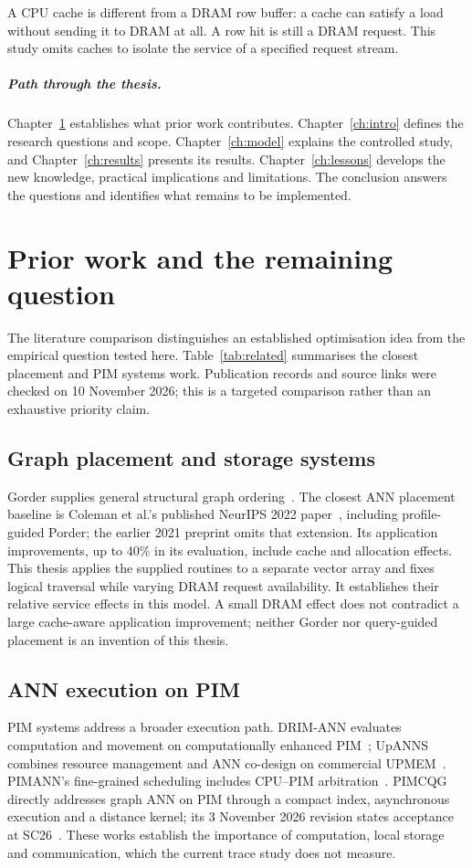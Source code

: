 \documentclass[11pt,a4paper]{report}
\begin{document}
A CPU cache is different from a DRAM row buffer: a cache can satisfy a load without sending it to DRAM at all. A row hit is still a DRAM request. This study omits caches to isolate the service of a specified request stream.

\paragraph{Path through the thesis.}
Chapter~\ref{ch:related} establishes what prior work contributes. Chapter~\ref{ch:intro} defines the research questions and scope. Chapter~\ref{ch:model} explains the controlled study, and Chapter~\ref{ch:results} presents its results. Chapter~\ref{ch:lessons} develops the new knowledge, practical implications and limitations. The conclusion answers the questions and identifies what remains to be implemented.

\chapter{Prior work and the remaining question}\label{ch:related}
\label{sec:prior-position}
The literature comparison distinguishes an established optimisation idea from the empirical question tested here. Table~\ref{tab:related} summarises the closest placement and PIM systems work. Publication records and source links were checked on 10 November 2026; this is a targeted comparison rather than an exhaustive priority claim.

\section{Graph placement and storage systems}
Gorder supplies general structural graph ordering~\cite{gorder}. The closest ANN placement baseline is Coleman et al.'s published NeurIPS 2022 paper~\cite{coleman}, including profile-guided Porder; the earlier 2021 preprint omits that extension. Its application improvements, up to 40\% in its evaluation, include cache and allocation effects. This thesis applies the supplied routines to a separate vector array and fixes logical traversal while varying DRAM request availability. It establishes their relative service effects in this model. A small DRAM effect does not contradict a large cache-aware application improvement; neither Gorder nor query-guided placement is an invention of this thesis.

\section{ANN execution on PIM}
PIM systems address a broader execution path. DRIM-ANN evaluates computation and movement on computationally enhanced PIM~\cite{drim}; UpANNS combines resource management and ANN co-design on commercial UPMEM~\cite{upanns}. PIMANN's fine-grained scheduling includes CPU--PIM arbitration~\cite{pimann}. PIMCQG directly addresses graph ANN on PIM through a compact index, asynchronous execution and a distance kernel; its 3 November 2026 revision states acceptance at SC26~\cite{pimcqg}. These works establish the importance of computation, local storage and communication, which the current trace study does not measure.
\end{document}
